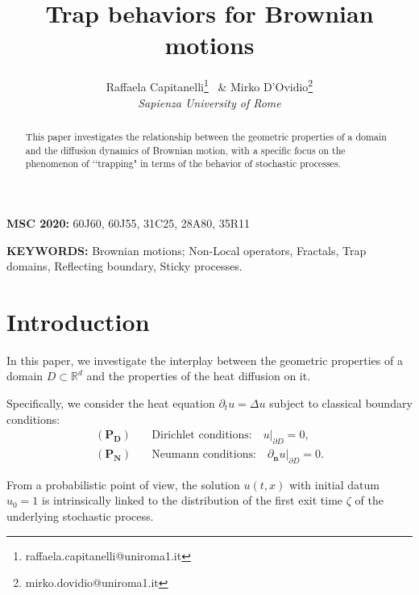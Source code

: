 \documentclass[[11pt,a4paper,reqno]{article}
\numberwithin{equation}{section}
\begin{document}
\title{Trap behaviors for Brownian motions}

\author{Raffaela Capitanelli\footnote{
raffaela.capitanelli@uniroma1.it} \, \& Mirko D'Ovidio\footnote{mirko.dovidio@uniroma1.it}\\
 \textit{Sapienza University of Rome}}
\maketitle

\begin{abstract}
    \quad This paper investigates the relationship between the geometric properties of a domain and the diffusion dynamics of Brownian motion, with a specific focus on the phenomenon of \lq\lq trapping"  in terms of  the behavior of stochastic processes.


\end{abstract}


\bigskip

{\bf MSC 2020:} 60J60, 60J55, 31C25, 28A80, 35R11

\bigskip

{\bf KEYWORDS:} Brownian motions;  Non-Local operators,  Fractals, Trap domains, Reflecting boundary, Sticky processes.


\section{Introduction}





In this paper, we investigate the interplay between the geometric properties of a  domain $D \subset \mathbb{R}^d$ and the properties  of the heat diffusion on it.



 Specifically, we consider the heat equation $\partial_t u = \Delta u$ subject to classical boundary conditions:$$\begin{aligned}
    (\mathbf{P_D}) \quad & \text{Dirichlet conditions:} \quad u|_{\partial D} = 0, \\
    (\mathbf{P_N}) \quad & \text{Neumann conditions:} \quad \partial_{\mathbf{n}} u|_{\partial D} = 0.
\end{aligned}$$



From a probabilistic point of view, the solution $u(t, x)$ with initial datum $u_0 = 1$ is intrinsically linked to the distribution of the first exit time $\zeta$ of the underlying stochastic process.
\end{document}
